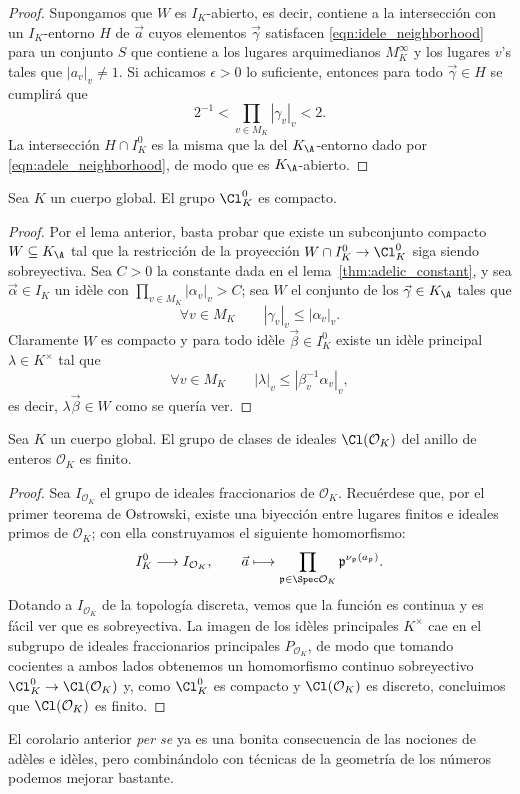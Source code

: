 \documentclass[teoria-numeros.tex]{subfiles}
\begin{document}
\begin{proof}
	Supongamos que $W$ es $I_K$-abierto, es decir, contiene a la intersección con un $I_K$-entorno $H$ de $\vec a$ cuyos elementos $\vec\gamma$
	satisfacen \eqref{eqn:idele_neighborhood} para un conjunto $S$ que contiene a los lugares arquimedianos $M_K^\infty$ y los lugares $v$'s
	tales que $|a_v|_v \ne 1$.
	Si achicamos $\epsilon > 0$ lo suficiente, entonces para todo $\vec\gamma \in H$ se cumplirá que
	$$ 2^{-1} < \prod_{v\in M_K} |\gamma_v|_v < 2. $$
	La intersección $H \cap I_K^0$ es la misma que la del $K_\A$-entorno dado por \eqref{eqn:adele_neighborhood}, de modo que es $K_\A$-abierto.
\end{proof}
\addtocounter{thmi}{-1}

\begin{thm}
	Sea $K$ un cuerpo global.
	El grupo $\Cl_K^0$ es compacto.
\end{thm}
\begin{proof}
	Por el lema anterior, basta probar que existe un subconjunto compacto $W \subseteq K_\A$ tal que la restricción de la proyección
	$W \cap I_K^0 \to \Cl_K^0$ siga siendo sobreyectiva.
	Sea $C > 0$ la constante dada en el lema~\ref{thm:adelic_constant}, y sea $\vec\alpha \in I_K$ un idèle con $\prod_{v\in M_K} |\alpha_v|_v > C$;
	sea $W$ el conjunto de los $\vec\gamma \in K_\A$ tales que
	$$ \forall v\in M_K \qquad |\gamma_v|_v \le |\alpha_v|_v. $$
	Claramente $W$ es compacto y para todo idèle $\vec\beta \in I_K^0$ existe un idèle principal $\lambda \in K^\times$ tal que
	$$ \forall v\in M_K \qquad | \lambda|_v \le |\beta_v^{-1}\alpha_v|_v, $$
	es decir, $\lambda\vec\beta \in W$ como se quería ver.
\end{proof}

\begin{cor}
	Sea $K$ un cuerpo global.
	El grupo de clases de ideales $\Cl(\mathcal{O}_K)$ del anillo de enteros $\mathcal{O}_K$ es finito.
\end{cor}
\begin{proof}
	Sea $I_{\mathcal{O}_K}$ el grupo de ideales fraccionarios de $\mathcal{O}_K$.
	Recuérdese que, por el primer teorema de Ostrowski, existe una biyección entre lugares finitos e ideales primos de $\mathcal{O}_K$;
	con ella construyamos el siguiente homomorfismo:
	\[
		I_K^0 \longrightarrow I_{\mathcal{O}_K}, \qquad
		\vec a \longmapsto \prod_{\mathfrak{p} \in \Spec\mathcal{O}_K} \mathfrak{p}^{ \nu_{\mathfrak{p}} (a_{\mathfrak{p}}) }.
	\]
	Dotando a $I_{\mathcal{O}_K}$ de la topología discreta, vemos que la función es continua y es fácil ver que es sobreyectiva.
	La imagen de los idèles principales $K^\times$ cae en el subgrupo de ideales fraccionarios principales $P_{\mathcal{O}_K}$,
	de modo que tomando cocientes a ambos lados obtenemos un homomorfismo continuo sobreyectivo $\Cl_K^0 \to \Cl(\mathcal{O}_K)$ y,
	como $\Cl_K^0$ es compacto y $\Cl(\mathcal{O}_K)$ es discreto, concluimos que $\Cl(\mathcal{O}_K)$ es finito.
\end{proof}
El corolario anterior \textit{per se} ya es una bonita consecuencia de las nociones de adèles e idèles,
pero combinándolo con técnicas de la geometría de los números podemos mejorar bastante.
\end{document}
